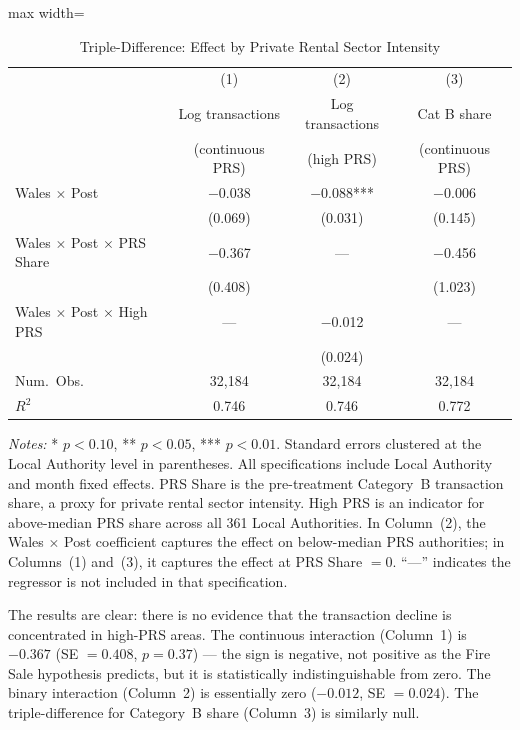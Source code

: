 \documentclass[12pt]{article}
\begin{document}
\begin{table}[H]
\centering
\caption{Triple-Difference: Effect by Private Rental Sector Intensity}
\label{tab:ddd}
\begin{threeparttable}
\begin{adjustbox}{max width=\textwidth}
\begin{tabular}{lccc}
\toprule
& (1) & (2) & (3) \\
& Log transactions & Log transactions & Cat B share \\
& (continuous PRS) & (high PRS) & (continuous PRS) \\
\midrule
Wales $\times$ Post & $-$0.038 & $-$0.088*** & $-$0.006 \\
& (0.069) & (0.031) & (0.145) \\[4pt]
Wales $\times$ Post $\times$ PRS Share & $-$0.367 & --- & $-$0.456 \\
& (0.408) & & (1.023) \\[4pt]
Wales $\times$ Post $\times$ High PRS & --- & $-$0.012 & --- \\
& & (0.024) & \\[6pt]
Num.\ Obs. & 32,184 & 32,184 & 32,184 \\
$R^2$ & 0.746 & 0.746 & 0.772 \\
\bottomrule
\end{tabular}
\end{adjustbox}
\begin{tablenotes}[flushleft]
\small
\item \textit{Notes:} * $p<0.10$, ** $p<0.05$, *** $p<0.01$. Standard errors clustered at the Local Authority level in parentheses. All specifications include Local Authority and month fixed effects. PRS Share is the pre-treatment Category~B transaction share, a proxy for private rental sector intensity. High PRS is an indicator for above-median PRS share across all 361 Local Authorities. In Column~(2), the Wales $\times$ Post coefficient captures the effect on below-median PRS authorities; in Columns~(1) and~(3), it captures the effect at PRS Share $= 0$. ``---'' indicates the regressor is not included in that specification.
\end{tablenotes}
\end{threeparttable}
\end{table}

The results are clear: there is no evidence that the transaction decline is concentrated in high-PRS areas. The continuous interaction (Column~1) is $-0.367$ (SE $= 0.408$, $p = 0.37$) --- the sign is negative, not positive as the Fire Sale hypothesis predicts, but it is statistically indistinguishable from zero. The binary interaction (Column~2) is essentially zero ($-0.012$, SE $= 0.024$). The triple-difference for Category~B share (Column~3) is similarly null.
\end{document}

